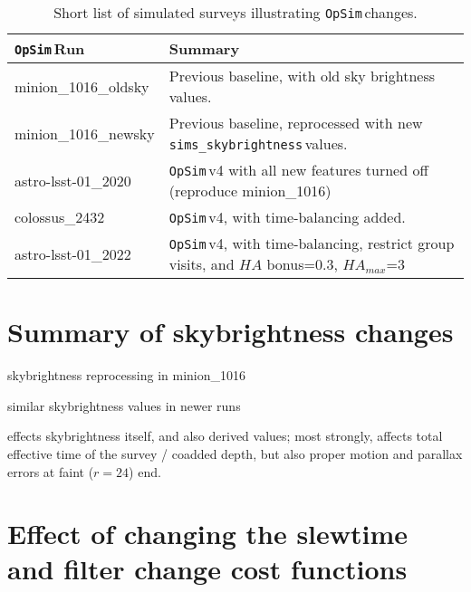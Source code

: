 \documentclass[DM,lsstdraft,authoryear,toc]{lsstdoc}
\newcommand{\opsim}{\texttt{OpSim}\,}
\newcommand{\simsky}{\texttt{sims\_skybrightness}\,}
\begin{document}
\begin{table}[htp]
\caption{Short list of simulated surveys illustrating \opsim changes.}
\begin{center}
\begin{tabular}{ l | l }
\opsim Run & Summary \\
\hline
minion\_1016\_oldsky & Previous baseline, with old sky brightness values. \\
minion\_1016\_newsky & Previous baseline, reprocessed with new \simsky values.\\
astro-lsst-01\_2020 & \opsim v4 with all new features turned off (reproduce minion\_1016) \\
colossus\_2432 & \opsim v4, with time-balancing added.\\
astro-lsst-01\_2022 & \opsim v4, with time-balancing, restrict group visits, and $HA$ bonus=0.3, $HA_{max}$=3 \\

\end{tabular}
\end{center}
\label{default}
\end{table}

\section{Summary of skybrightness changes}

skybrightness reprocessing in minion\_1016

similar skybrightness values in newer runs

effects skybrightness itself, and also derived values; most strongly, affects total effective time of the survey / coadded depth, but also proper motion and parallax errors at faint ($r=24$) end.

\section{Effect of changing the slewtime and filter change cost functions}
\end{document}

